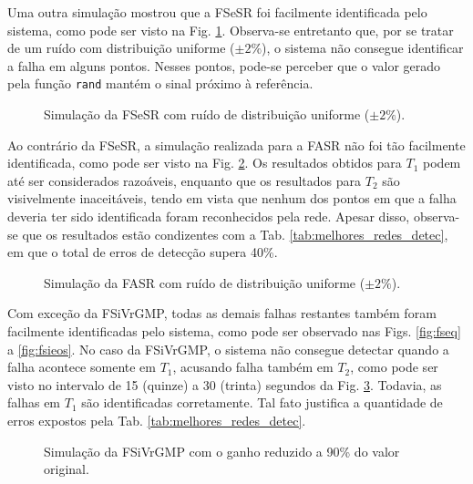 Uma outra simulação mostrou que a FSeSR foi facilmente identificada pelo
sistema, como pode ser visto na Fig. \ref{fig:fsesr}. Observa-se entretanto que,
por se tratar de um ruído com distribuição uniforme ($\pm 2\%$), o sistema não
consegue identificar a falha em alguns pontos. Nesses pontos, pode-se perceber
que o valor gerado pela função {\tt rand} mantém o sinal próximo à referência.

\begin{figure}[htb]
\footnotesize
\centering

\vspace{1cm}
\caption{Simulação da FSeSR com ruído de distribuição uniforme ($\pm 2\%$).}
\label{fig:fsesr}
\end{figure}

Ao contrário da FSeSR, a simulação realizada para a FASR não foi tão facilmente
identificada, como pode ser visto na Fig. \ref{fig:fasr}. Os resultados obtidos
para $T_1$ podem até ser considerados razoáveis, enquanto que os resultados para
$T_2$ são visivelmente inaceitáveis, tendo em vista que nenhum dos pontos em que
a falha deveria ter sido identificada foram reconhecidos pela rede. Apesar
disso, observa-se que os resultados estão condizentes com a Tab.
\ref{tab:melhores_redes_detec}, em que o total de erros de detecção supera 40\%.

\begin{figure}[htb] 
\footnotesize 
\centering 

\vspace{1cm} 
\caption{Simulação da FASR com ruído de distribuição uniforme ($\pm 2\%$).} 
\label{fig:fasr} 
\end{figure}

Com exceção da FSiVrGMP, todas as demais falhas restantes também foram
facilmente identificadas pelo sistema, como pode ser observado nas Figs.
\ref{fig:fseq} a \ref{fig:fsieos}. No caso da FSiVrGMP, o sistema não consegue
detectar quando a falha acontece somente em $T_1$, acusando falha também em
$T_2$, como pode ser visto no intervalo de 15 (quinze) a 30 (trinta) segundos da
Fig. \ref{fig:fsivrgmp}. Todavia, as falhas em $T_1$ são identificadas
corretamente. Tal fato justifica a quantidade de erros expostos pela Tab.
\ref{tab:melhores_redes_detec}.

\begin{figure}[htb]
\footnotesize
\centering

\vspace{1cm}
\caption{Simulação da FSiVrGMP com o ganho reduzido a 90\% do valor original.}
\label{fig:fsivrgmp}
\end{figure}

